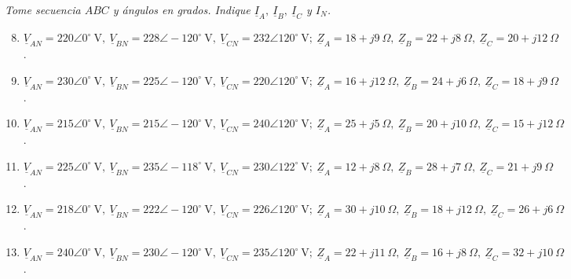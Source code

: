 \documentclass[../main]{subfiles}
\begin{document}
\textit{Tome secuencia $ABC$ y \'angulos{} en grados. Indique $\underline{I}_A,\ \underline{I}_B,\ \underline{I}_C$ y $I_N$.}
\begin{enumerate}
\setcounter{enumi}{7}
\item $\underline{V}_{AN}=220\angle 0^\circ\ \text{V},\ \underline{V}_{BN}=228\angle -120^\circ\ \text{V},\ \underline{V}_{CN}=232\angle 120^\circ\ \text{V};\ \underline{Z}_A=18+j9\ \Omega,\ \underline{Z}_B=22+j8\ \Omega,\ \underline{Z}_C=20+j12\ \Omega$.
\item $\underline{V}_{AN}=230\angle 0^\circ\ \text{V},\ \underline{V}_{BN}=225\angle -120^\circ\ \text{V},\ \underline{V}_{CN}=220\angle 120^\circ\ \text{V};\ \underline{Z}_A=16+j12\ \Omega,\ \underline{Z}_B=24+j6\ \Omega,\ \underline{Z}_C=18+j9\ \Omega$.
\item $\underline{V}_{AN}=215\angle 0^\circ\ \text{V},\ \underline{V}_{BN}=215\angle -120^\circ\ \text{V},\ \underline{V}_{CN}=240\angle 120^\circ\ \text{V};\ \underline{Z}_A=25+j5\ \Omega,\ \underline{Z}_B=20+j10\ \Omega,\ \underline{Z}_C=15+j12\ \Omega$.
\item $\underline{V}_{AN}=225\angle 0^\circ\ \text{V},\ \underline{V}_{BN}=235\angle -118^\circ\ \text{V},\ \underline{V}_{CN}=230\angle 122^\circ\ \text{V};\ \underline{Z}_A=12+j8\ \Omega,\ \underline{Z}_B=28+j7\ \Omega,\ \underline{Z}_C=21+j9\ \Omega$.
\item $\underline{V}_{AN}=218\angle 0^\circ\ \text{V},\ \underline{V}_{BN}=222\angle -120^\circ\ \text{V},\ \underline{V}_{CN}=226\angle 120^\circ\ \text{V};\ \underline{Z}_A=30+j10\ \Omega,\ \underline{Z}_B=18+j12\ \Omega,\ \underline{Z}_C=26+j6\ \Omega$.
\item $\underline{V}_{AN}=240\angle 0^\circ\ \text{V},\ \underline{V}_{BN}=230\angle -120^\circ\ \text{V},\ \underline{V}_{CN}=235\angle 120^\circ\ \text{V};\ \underline{Z}_A=22+j11\ \Omega,\ \underline{Z}_B=16+j8\ \Omega,\ \underline{Z}_C=32+j10\ \Omega$.
\end{enumerate}
\end{document}
